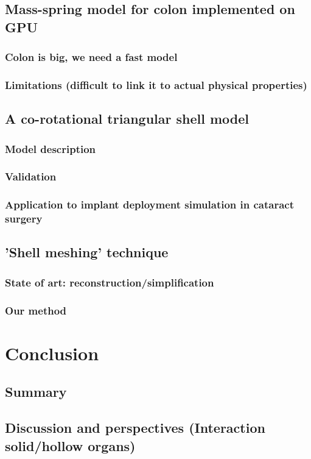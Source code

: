 	\chapter{Mass-spring model for colon implemented on GPU }
		\section{Colon is big, we need a fast model}
		\section{Limitations (difficult to link it to actual physical properties)}

	\chapter{A co-rotational triangular shell model }
		\section{Model description}
		\section{Validation}
		\section{Application to implant deployment simulation in cataract surgery}
	
	\chapter{'Shell meshing' technique }
		\section{State of art: reconstruction/simplification}
		\section{Our method}
		
	
\part{Conclusion}
	\chapter{Summary}
	\chapter{Discussion and perspectives (Interaction solid/hollow organs)}
